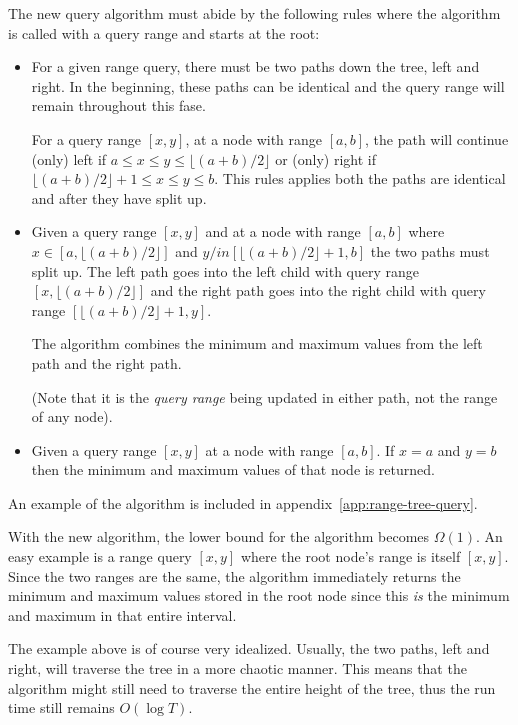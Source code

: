 The new query algorithm must abide by the following rules where the algorithm is
called with a query range and starts at the root:
\begin{itemize}
    \item For a given range query, there must be two paths down the tree, left
    and right. In the beginning, these paths can be identical and the query
    range will remain throughout this fase. 

    For a query range $[x,y]$, at a node with range $[a,b]$, the path will
    continue (only) left if $a \leq x \leq y \leq \lfloor (a+b) / 2
    \rfloor$ or (only) right if $\lfloor (a+b) / 2 \rfloor + 1 \leq x \leq y \leq
    b$. This rules applies both the paths are identical and after they have
    split up. 

    \item Given a query range $[x,y]$ and at
    a node with range $[a,b]$ where $x \in [a,\lfloor (a+b) / 2 \rfloor]$ and $y
    /in [\lfloor (a+b) / 2 \rfloor + 1,b]$ the two paths must split up. The left
    path goes into the left child with query range $[x,\lfloor (a+b) / 2
    \rfloor]$ and the right path goes into the right child with query range
    $[\lfloor (a+b) / 2 \rfloor + 1,y]$. 

    The algorithm combines the minimum and maximum values from the left path and
    the right path. 

    (Note that it is the \textit{query range} being updated in either path, not
    the range of any node). 

    \item Given a query range $[x,y]$ at a node with range $[a,b]$. If $x = a$
    and $y = b$ then the minimum and maximum values of that node is returned. 
\end{itemize}
An example of the algorithm is included in
appendix~\ref{app:range-tree-query}. 

With the new algorithm, the lower bound for the algorithm becomes $\Omega(1)$.
An easy example is a range query $[x,y]$ where the root node's range is itself
$[x,y]$. Since the two ranges are the same, the algorithm immediately returns the
minimum and maximum values stored in the root node since this \textit{is} the
minimum and maximum in that entire interval. 

The example above is of course very idealized. Usually, the two paths,
left and right, will traverse the tree in a more chaotic manner. This means that
the algorithm might still need to traverse the entire height of the tree, thus
the run time still remains $O(\log T)$. 

